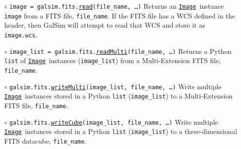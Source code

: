 \documentclass[preprint,10pt]{../../devel/modules/aastex}
\newcommand\Image{\href{http://galsim-developers.github.io/GalSim/classgalsim_1_1image_1_1_image.html}{\texttt{Image}}}
\begin{document}
\begin{itemize}

  \item[$\circ$]
  \texttt{image = galsim.fits.\href{http://galsim-developers.github.io/GalSim/namespacegalsim_1_1fits.html\#abbad6f82a80bc74fb22a752af1bbd8e9}{read}(file\_name, \dots)}
    \newline
    Returns an \Image\ instance \texttt{image} from a FITS file, \texttt{file\_name}.
    If the FITS file has a WCS defined in the header,
    then GalSim will attempt to read that WCS and store it as \texttt{image.wcs}.
  \item[$\circ$]
  \texttt{image\_list = galsim.fits.\href{http://galsim-developers.github.io/GalSim/namespacegalsim_1_1fits.html\#ae7aacb9f44faf9e487e83e12b9dd9067}{readMulti}(file\_name, \dots)}
    \newline
    Returns a Python \texttt{list} of \Image\ instances (\texttt{image\_list}) from a
    Multi-Extension FITS file, \texttt{file\_name}.
  \item[$\circ$]
  \texttt{galsim.fits.\href{http://galsim-developers.github.io/GalSim/namespacegalsim_1_1fits.html\#a17dbb70385408586795efade476cdc98}{writeMulti}(image\_list, file\_name, \dots)}
    \newline
    Write multiple \Image\ instances stored in a Python
    \texttt{list} (\texttt{image\_list}) to a Multi-Extension FITS file, \texttt{file\_name}.
  \item[$\circ$]
  \texttt{galsim.fits.\href{http://galsim-developers.github.io/GalSim/namespacegalsim_1_1fits.html\#aa4fbd5ed42ffecda339a409296f0f101}{writeCube}(image\_list, file\_name, \dots)}
    \newline
    Write multiple \Image\ instances stored in a Python
    \texttt{list} (\texttt{image\_list}) to a three-dimensional FITS datacube, \texttt{file\_name}.

\end{itemize}
\end{document}
